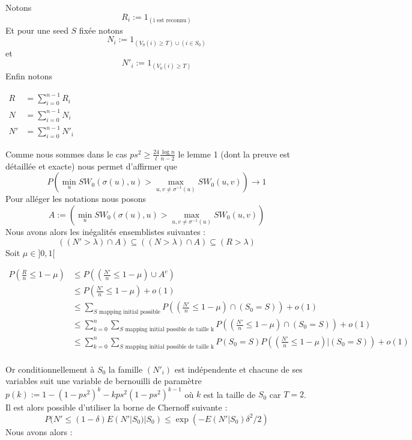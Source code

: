 \documentclass[letterpaper,10pt]{llncs}
\begin{document}
Notons
\[
R_i := 1_{(\text{i est reconnu})}
\]
Et pour une seed $S$ fixée notons
\[
N_i := 1_{(V_0(i) \geq T) \cup (i \in S_0)}
\]
et
\[
N'_i := 1_{(V_0(i) \geq T) }
\]
Enfin notons
\begin{center}
$\begin{aligned}
  R &= \sum_{i=0}^{n-1} R_i\\
  N &= \sum_{i=0}^{n-1} N_i\\
  N' &= \sum_{i=0}^{n-1} N'_i
\end{aligned}$
\end{center}

Comme nous sommes dans le cas $ps^2 \geq \frac{24}{l} \frac{\log n}{n-2}$ le lemme 1 (dont la preuve est détaillée et exacte) nous permet d'affirmer que 
\[
P(\min_u SW_0(\sigma(u),u) > \max_{u, v \neq \sigma^{-1}(u)} SW_0(u,v)) \rightarrow 1
\]
Pour alléger les notations nous posons 
\[
A := (\min_u SW_0(\sigma(u),u) > \max_{u, v \neq \sigma^{-1}(u)} SW_0(u,v))
\]
Nous avons alors les inégalités ensemblistes suivantes :
\[
((N' > \lambda) \cap A) \subseteq ((N > \lambda) \cap A) \subseteq (R > \lambda)
\]
Soit $\mu \in ]0,1[$
\begin{center}
$\begin{aligned}
  P(\frac{R}{n} \leq 1 - \mu) &\leq P((\frac{N'}{n} \leq 1 - \mu) \cup A^c) \\
  &\leq P(\frac{N'}{n} \leq 1 - \mu) + o(1) \\
  &\leq \sum_{S \text{ mapping initial possible}} P((\frac{N'}{n} \leq 1 - \mu) \cap (S_0 = S)) + o(1) \\
  &\leq \sum_{k = 0}^{n} \sum_{S \text{ mapping initial possible de taille k}} P((\frac{N'}{n} \leq 1 - \mu) \cap (S_0 = S)) + o(1) \\
  &\leq \sum_{k = 0}^{n} \sum_{S \text{ mapping initial possible de taille k}} P(S_0 = S) P((\frac{N'}{n} \leq 1 - \mu) | (S_0 = S)) + o(1) \\
\end{aligned}$
\end{center}
Or conditionnellement à $S_0$ la famille $(N'_i)$ est indépendente et chacune de ses variables suit une variable de bernouilli de paramètre $p(k) := 1-(1-ps^2)^k-kps^2(1-ps^2)^{k-1}$ où $k$ est la taille de $S_0$ car $T = 2$. Il est alors possible d'utiliser la borne de Chernoff suivante :
\[
P(N' \leq (1-\delta) E(N'|S_0) | S_0) \leq \exp(-E(N'|S_0) \delta^2 / 2) 
\]
Nous avons alors :
\end{document}
